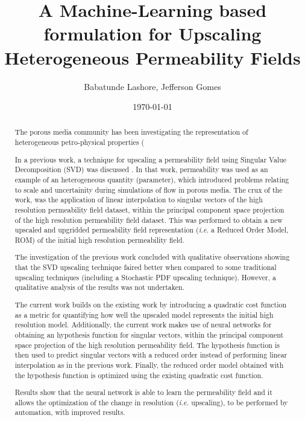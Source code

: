 \documentclass[12pts,a4paper,amsmath,amssymb,floatfix]{article}
\title{A Machine-Learning based formulation for Upscaling Heterogeneous Permeability Fields}
\author{Babatunde Lashore, Jefferson Gomes}
\affil{School of Engineering, University of Aberdeen, UK, b.lashore@abdn.ac.uk}
\date \today
\begin{document}
\maketitle
\thispagestyle{fancy}
\begin{abstract}

The porous media community has been investigating the representation of heterogeneous petro-physical properties (


In a previous work, a technique for upscaling a permeability field using Singular Value Decomposition (SVD) was discussed \cite{Lashore_2018}. In that work, permeability was used as an example of an heterogeneous quantity (parameter), which introduced problems relating to scale and uncertainity during simulations of flow in porous media. The crux of the work, was the application of linear interpolation to singular vectors of the high resolution permeability field dataset, within the principal component space projection of the high resolution permeability field dataset. This was performed to obtain a new upscaled and upgridded permeability field representation ({\it i.e.} a Reduced Order Model, ROM) of the initial high resolution permeability field.

The investigation of the previous work concluded with qualitative observations showing that the SVD upscaling technique faired better when compared to some traditional upscaling techniques (including a Stochastic PDF upscaling technique). However, a qualitative analysis of the results was not undertaken.

The current work builds on the existing work by introducing a quadratic cost function as a metric for quantifying how well the upscaled model represents the initial high resolution model. Additionally, the current work makes use of neural networks \cite{Smola_2008, Russell_2009} for obtaining an hypothesis function for singular vectors, within the principal component space projection of the high resolution permeability field. The hypothesis function is then used to predict singular vectors with a reduced order instead of performing linear interpolation as in the previous work. Finally, the reduced order model obtained with the hypothesis function is optimized using the existing quadratic cost function.

Results show that the neural network is able to learn the permeability field and it allows the optimization of the change in resolution ({\it i.e.} upscaling), to be performed by automation, with improved results. 


\end{abstract} 
\end{document}

